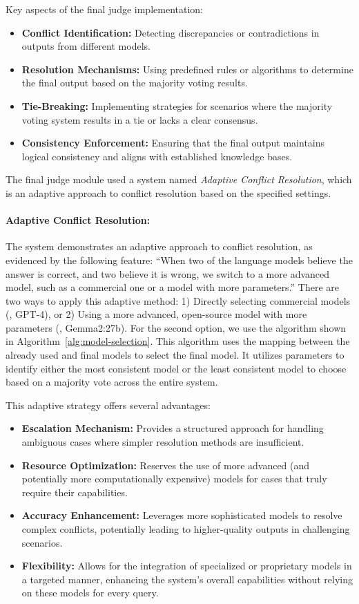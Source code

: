 Key aspects of the final judge implementation:
\begin{itemize}
    \item \textbf{Conflict Identification:} Detecting discrepancies or contradictions in outputs from different models.
    \item \textbf{Resolution Mechanisms:} Using predefined rules or algorithms to determine the final output based on the majority voting results.
    \item \textbf{Tie-Breaking:} Implementing strategies for scenarios where the majority voting system results in a tie or lacks a clear consensus.
    \item \textbf{Consistency Enforcement:} Ensuring that the final output maintains logical consistency and aligns with established knowledge bases.
\end{itemize}

The final judge module used a system named \textit{Adaptive Conflict Resolution}, which is an adaptive approach to conflict resolution based on the specified settings.

\paragraph{Adaptive Conflict Resolution:}
The system demonstrates an adaptive approach to conflict resolution, as evidenced by the following feature:
``When two of the language models believe the answer is correct, and two believe it is wrong, we switch to a more advanced model, such as a commercial one or a model with more parameters.''
There are two ways to apply this adaptive method: 1) Directly selecting commercial models (\eg, GPT-4), or 2) Using a more advanced, open-source model with more parameters (\eg, Gemma2:27b).
For the second option, we use the algorithm shown in Algorithm~\ref{alg:model-selection}.
This algorithm uses the mapping between the already used and final models to select the final model.
It utilizes parameters to identify either the most consistent model or the least consistent model to choose based on a majority vote across the entire system.

This adaptive strategy offers several advantages:
\begin{itemize}
    \item \textbf{Escalation Mechanism:} Provides a structured approach for handling ambiguous cases where simpler resolution methods are insufficient.
    \item \textbf{Resource Optimization:} Reserves the use of more advanced (and potentially more computationally expensive) models for cases that truly require their capabilities.
    \item \textbf{Accuracy Enhancement:} Leverages more sophisticated models to resolve complex conflicts, potentially leading to higher-quality outputs in challenging scenarios.
    \item \textbf{Flexibility:} Allows for the integration of specialized or proprietary models in a targeted manner, enhancing the system's overall capabilities without relying on these models for every query.
\end{itemize}

